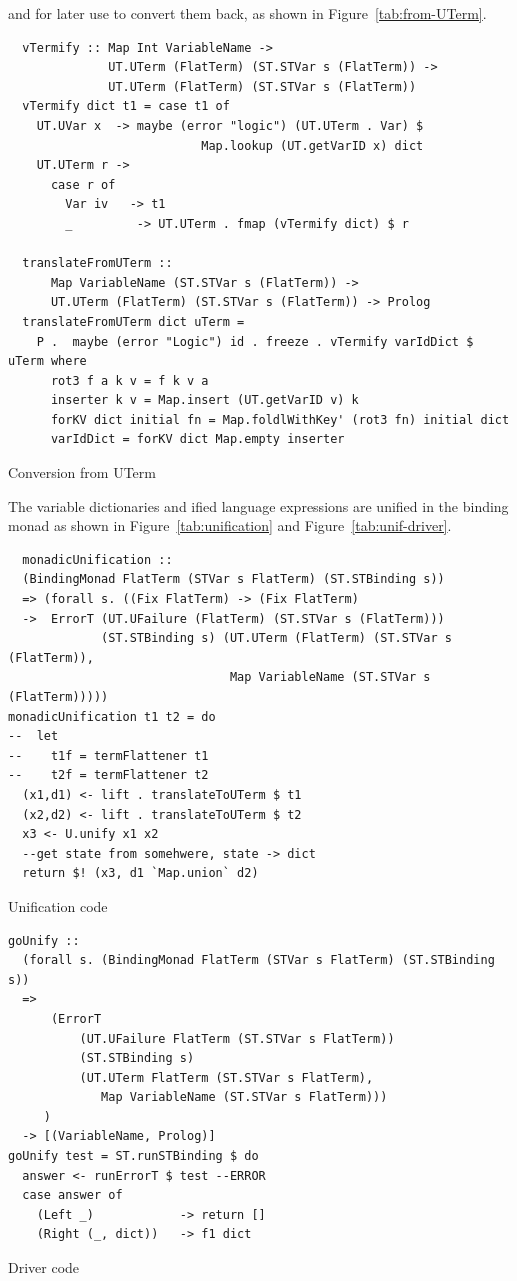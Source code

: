 \documentclass[thesis-solanki.tex]{subfiles}
\begin{document}
%
and for later use to convert them back, as shown in Figure~\ref{tab:from-UTerm}.
%
\begin{code-list}
  \begin{verbatim}
  vTermify :: Map Int VariableName ->
              UT.UTerm (FlatTerm) (ST.STVar s (FlatTerm)) ->
              UT.UTerm (FlatTerm) (ST.STVar s (FlatTerm))
  vTermify dict t1 = case t1 of
    UT.UVar x  -> maybe (error "logic") (UT.UTerm . Var) $
                           Map.lookup (UT.getVarID x) dict
    UT.UTerm r ->
      case r of
        Var iv   -> t1
        _         -> UT.UTerm . fmap (vTermify dict) $ r

  translateFromUTerm ::
      Map VariableName (ST.STVar s (FlatTerm)) ->
      UT.UTerm (FlatTerm) (ST.STVar s (FlatTerm)) -> Prolog
  translateFromUTerm dict uTerm =
    P .  maybe (error "Logic") id . freeze . vTermify varIdDict $ uTerm where
      rot3 f a k v = f k v a
      inserter k v = Map.insert (UT.getVarID v) k
      forKV dict initial fn = Map.foldlWithKey' (rot3 fn) initial dict
      varIdDict = forKV dict Map.empty inserter
  \end{verbatim}
  \caption{Conversion from UTerm}
  \label{tab:from-UTerm}
\end{code-list}

\clearpage
The variable dictionaries and ified language expressions are unified in the binding monad as shown
in Figure~\ref{tab:unification} and Figure~\ref{tab:unif-driver}.
%
\begin{code-list}
\begin{verbatim}
  monadicUnification ::
  (BindingMonad FlatTerm (STVar s FlatTerm) (ST.STBinding s))
  => (forall s. ((Fix FlatTerm) -> (Fix FlatTerm)
  ->  ErrorT (UT.UFailure (FlatTerm) (ST.STVar s (FlatTerm)))
             (ST.STBinding s) (UT.UTerm (FlatTerm) (ST.STVar s (FlatTerm)),
                               Map VariableName (ST.STVar s (FlatTerm)))))
monadicUnification t1 t2 = do
--  let
--    t1f = termFlattener t1
--    t2f = termFlattener t2
  (x1,d1) <- lift . translateToUTerm $ t1
  (x2,d2) <- lift . translateToUTerm $ t2
  x3 <- U.unify x1 x2
  --get state from somehwere, state -> dict
  return $! (x3, d1 `Map.union` d2)
\end{verbatim}
  \vspace*{-1.0\baselineskip}
  \caption{Unification code}
  \label{tab:unification}

\begin{verbatim}
goUnify ::
  (forall s. (BindingMonad FlatTerm (STVar s FlatTerm) (ST.STBinding s))
  =>
      (ErrorT
          (UT.UFailure FlatTerm (ST.STVar s FlatTerm))
          (ST.STBinding s)
          (UT.UTerm FlatTerm (ST.STVar s FlatTerm),
             Map VariableName (ST.STVar s FlatTerm)))
     )
  -> [(VariableName, Prolog)]
goUnify test = ST.runSTBinding $ do
  answer <- runErrorT $ test --ERROR
  case answer of
    (Left _)            -> return []
    (Right (_, dict))   -> f1 dict
\end{verbatim}
  \vspace*{-1.0\baselineskip}
  \caption{Driver code}
  \label{tab:unif-driver}
\end{code-list}
\end{document}

